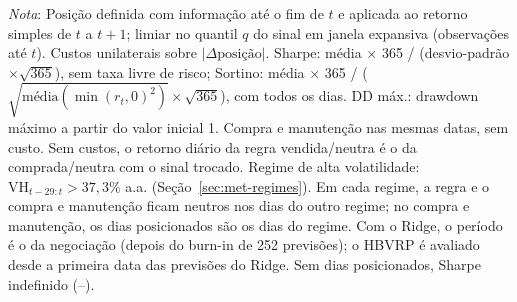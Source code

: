 \begin{table}[H]
\centering
\small
\caption{Estratégias por regime de volatilidade (quantil 80\%): Ridge de 27/02/2024 a 02/03/2026 e HBVRP de 21/06/2023 a 02/03/2026.}
\label{tab:estr-regimes}
\par\smallskip
\parbox{0.95\linewidth}{\footnotesize\textit{Nota}: Posição definida com informação até o fim de $t$ e aplicada ao retorno simples de $t$ a $t+1$; limiar no quantil $q$ do sinal em janela expansiva (observações até $t$). Custos unilaterais sobre $|\Delta \text{posição}|$. Sharpe: média $\times$ 365 / (desvio-padrão $\times \sqrt{365}$), sem taxa livre de risco; Sortino: média $\times$ 365 / ($\sqrt{\text{média}(\min(r_t, 0)^2)} \times \sqrt{365}$), com todos os dias. DD máx.: drawdown máximo a partir do valor inicial 1. Compra e manutenção nas mesmas datas, sem custo. Sem custos, o retorno diário da regra vendida/neutra é o da comprada/neutra com o sinal trocado. Regime de alta volatilidade: $\text{VH}_{t-29:t} > 37{,}3\%$ a.a. (Seção~\ref{sec:met-regimes}). Em cada regime, a regra e o compra e manutenção ficam neutros nos dias do outro regime; no compra e manutenção, os dias posicionados são os dias do regime. Com o Ridge, o período é o da negociação (depois do burn-in de 252 previsões); o HBVRP é avaliado desde a primeira data das previsões do Ridge. Sem dias posicionados, Sharpe indefinido (--).}
\end{table}
